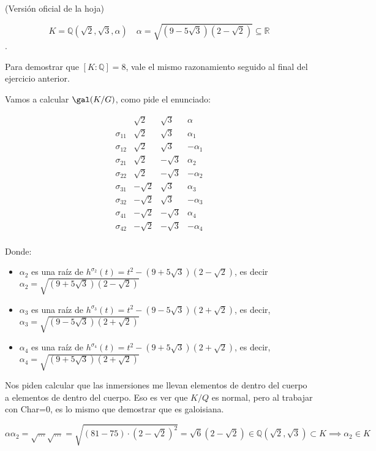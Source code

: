 \begin{problem}[5] (Versión oficial de la hoja)

$$K = ℚ(\sqrt{2},\sqrt{3},α) \quad α = \sqrt{(9-5\sqrt{3})(2-\sqrt{2})} \subseteq ℝ$$.

\solution

Para demostrar que $[K:ℚ] = 8$, vale el mismo razonamiento seguido al final del ejercicio anterior.


Vamos a calcular $\gal(K/G)$, como pide el enunciado:

$$\begin{array}{c|c|c|c}
&\sqrt{2}&\sqrt{3} & α \\\hline
σ_{11} & \sqrt{2} & \sqrt{3} & α_1 \\
σ_{12} & \sqrt{2} & \sqrt{3} & -α_1 \\\hline

σ_{21} & \sqrt{2} & -\sqrt{3} &  α_2\\
σ_{22} & \sqrt{2} & -\sqrt{3} & -α_2 \\\hline

σ_{31} & -\sqrt{2} & \sqrt{3} & α_3 \\
σ_{32} & -\sqrt{2} & \sqrt{3} & -α_3 \\\hline

σ_{41} & -\sqrt{2} & -\sqrt{3} & α_4 \\
σ_{42} & -\sqrt{2} & -\sqrt{3} & -α_4 \\
\end{array}
$$



Donde:
\begin{itemize}
\item $α_2$ es una raíz de  $h^{σ_2}(t) = t^2 - (9+5\sqrt{3})(2-\sqrt{2})$, es decir $α_2 = \sqrt{(9+5\sqrt{3})(2-\sqrt{2})}$

\item $α_3$ es una raíz de $h^{σ_3}(t) = t^2 - (9-5\sqrt{3})(2+\sqrt{2})$, es decir, $α_3 = \sqrt{(9-5\sqrt{3})(2+\sqrt{2})}$

\item $α_4$ es una raíz de $h^{σ_4}(t) = t^2 - (9+5\sqrt{3})(2+\sqrt{2})$, es decir, $α_4 = \sqrt{(9+5\sqrt{3})(2+\sqrt{2})}$
\end{itemize}


Nos piden calcular que las inmersiones me llevan elementos de dentro del cuerpo a elementos de dentro del cuerpo. Eso es ver que $K/Q$ es normal, pero al trabajar con Char=0, es lo mismo que demostrar que es galoisiana.


$$αα_2 = \sqrt{...}\sqrt{...} = \sqrt{(81 - 75)·(2-\sqrt{2})^2} = \sqrt{6}(2-\sqrt{2}) ∈ ℚ(\sqrt{2},\sqrt{3}) \subset K \implies α_2 ∈ K$$


\end{problem}
